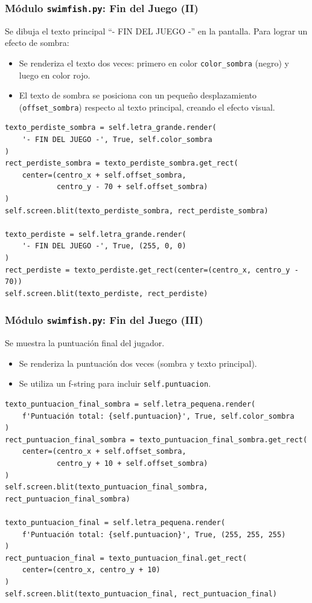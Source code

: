 \documentclass[
	11pt, %
]{beamer}
\begin{document}
\begin{frame}[fragile]
\frametitle{Módulo \texttt{swimfish.py}: Fin del Juego (II)}

Se dibuja el texto principal ``- FIN DEL JUEGO -'' en la pantalla. Para lograr un
efecto de sombra:

\begin{itemize}
    \item Se renderiza el texto dos veces: primero en color
          \texttt{color\_sombra} (negro) y luego en color rojo.
    \item El texto de sombra se posiciona con un pequeño desplazamiento
          (\texttt{offset\_sombra}) respecto al texto principal, creando el efecto visual.
\end{itemize}

\vspace{4pt}
{\scriptsize
\begin{verbatim}
texto_perdiste_sombra = self.letra_grande.render(
    '- FIN DEL JUEGO -', True, self.color_sombra
)
rect_perdiste_sombra = texto_perdiste_sombra.get_rect(
    center=(centro_x + self.offset_sombra,
            centro_y - 70 + self.offset_sombra)
)
self.screen.blit(texto_perdiste_sombra, rect_perdiste_sombra)

texto_perdiste = self.letra_grande.render(
    '- FIN DEL JUEGO -', True, (255, 0, 0)
)
rect_perdiste = texto_perdiste.get_rect(center=(centro_x, centro_y - 70))
self.screen.blit(texto_perdiste, rect_perdiste)
\end{verbatim}
}

\end{frame}
\begin{frame}[fragile]
\frametitle{Módulo \texttt{swimfish.py}: Fin del Juego (III)}

Se muestra la puntuación final del jugador.

\begin{itemize}
    \item Se renderiza la puntuación dos veces (sombra y texto principal).
    \item Se utiliza un f-string para incluir \texttt{self.puntuacion}.
\end{itemize}

\vspace{4pt}

\scriptsize
\begin{verbatim}
texto_puntuacion_final_sombra = self.letra_pequena.render(
    f'Puntuación total: {self.puntuacion}', True, self.color_sombra
)
rect_puntuacion_final_sombra = texto_puntuacion_final_sombra.get_rect(
    center=(centro_x + self.offset_sombra,
            centro_y + 10 + self.offset_sombra)
)
self.screen.blit(texto_puntuacion_final_sombra, rect_puntuacion_final_sombra)

texto_puntuacion_final = self.letra_pequena.render(
    f'Puntuación total: {self.puntuacion}', True, (255, 255, 255)
)
rect_puntuacion_final = texto_puntuacion_final.get_rect(
    center=(centro_x, centro_y + 10)
)
self.screen.blit(texto_puntuacion_final, rect_puntuacion_final)
\end{verbatim}
\normalsize

\end{frame}
\end{document}
